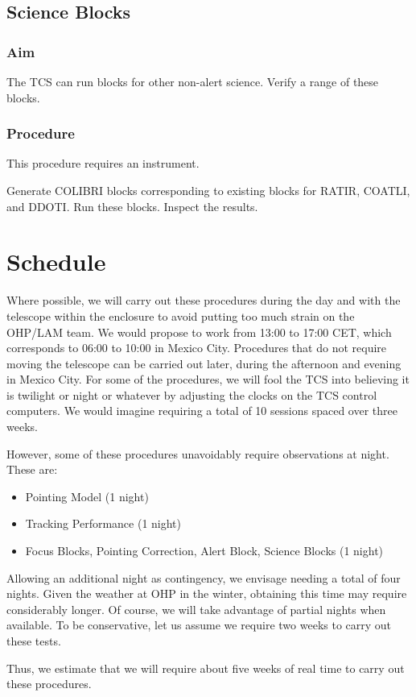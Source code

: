 \documentclass{article}
\begin{document}
\subsection{Science Blocks}

\subsubsection{Aim}

The TCS can run blocks for other non-alert science. Verify a range of these blocks.

\subsubsection{Procedure}

This procedure requires an instrument.

Generate COLIBRI blocks corresponding to existing blocks for RATIR, COATLI, and DDOTI. Run these blocks. Inspect the results.


\section{Schedule}
\label{section:schedule}

Where possible, we will carry out these procedures during the day and with the telescope within the enclosure to avoid putting too much strain on the OHP/LAM team. We would propose to work from 13:00 to 17:00 CET, which corresponds to 06:00 to 10:00 in Mexico City. Procedures that do not require moving the telescope can be carried out later, during the afternoon and evening in Mexico City. For some of the procedures, we will fool the TCS into believing it is twilight or night or whatever by adjusting the clocks on the TCS control computers. We would imagine requiring a total of 10 sessions spaced over three weeks.

However, some of these procedures unavoidably require observations at night. These are:
\begin{itemize}
\item Pointing Model (1 night)
\item Tracking Performance (1 night)
\item Focus Blocks, Pointing Correction, Alert Block, Science Blocks (1 night)
\end{itemize}
Allowing an additional night as contingency, we envisage needing a total of four nights. Given the weather at OHP in the winter, obtaining this time may require considerably longer. Of course, we will take advantage of partial nights when available. To be conservative, let us assume we require two weeks to carry out these tests.

Thus, we estimate that we will require about five weeks of real time to carry out these procedures.
\end{document}
